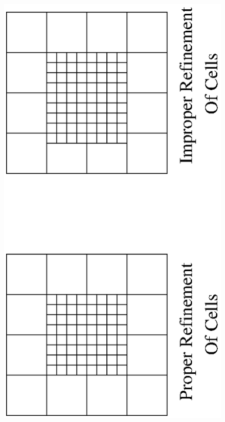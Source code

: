 \begin{figure}[htp]
\centerline{
\includegraphics[type=eps,ext=.eps,read=.eps]{figs/propernest.req.1}
}
\end{figure}
